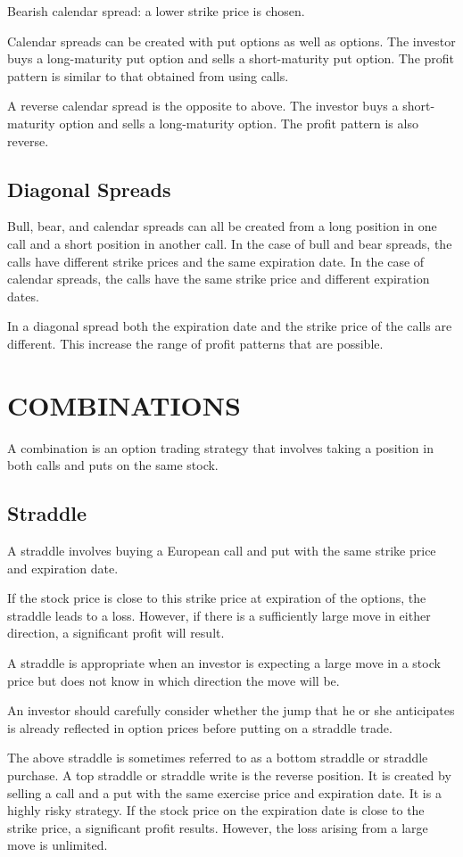\documentclass{article}
\begin{document}
Bearish calendar spread: a lower strike price is chosen.

Calendar spreads can be created with put options as well as options. The investor buys a long-maturity put option and sells a short-maturity put option. The profit pattern is similar to that obtained from using calls.

A reverse calendar spread is the opposite to above. The investor buys a short-maturity option and sells a long-maturity option. The profit pattern is also reverse.

\subsection{Diagonal Spreads}
Bull, bear, and calendar spreads can all be created from a long position in one call and a short position in another call. In the case of bull and bear spreads, the calls have different strike prices and the same expiration date. In the case of calendar spreads, the calls have the same strike price and different expiration dates.

In a diagonal spread both the expiration date and the strike price of the calls are different. This increase the range of profit patterns that are possible.

\section{COMBINATIONS}
A combination is an option trading strategy that involves taking a position in both calls and puts on the same stock.
\subsection{Straddle}
A straddle involves buying a European call and put with the same strike price and expiration date.

If the stock price is close to this strike price at expiration of the options, the straddle leads to a loss. However, if there is a sufficiently large move in either direction, a significant profit will result.

A straddle is appropriate when an investor is expecting a large move in a stock price but does not know in which direction the move will be.

An investor should carefully consider whether the jump that he or she anticipates is already reflected in option prices before putting on a straddle trade.

The above straddle is sometimes referred to as a bottom straddle or straddle purchase. A top straddle or straddle write is the reverse position. It is created by selling a call and a put with the same exercise price and expiration date. It is a highly risky strategy. If the stock price on the expiration date is close to the strike price, a significant profit results. However, the loss arising from a large move is unlimited.
\end{document}
